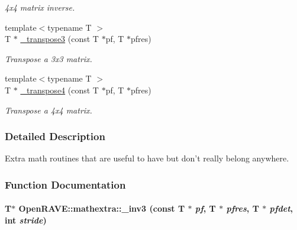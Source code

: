 \begin{DoxyCompactItemize}
\begin{DoxyCompactList}\small\item\em 4x4 matrix inverse. \item\end{DoxyCompactList}\item 
\hypertarget{namespaceOpenRAVE_1_1mathextra_a98432a8613c3ee83bb5b6d2092b406ff}{
{\footnotesize template$<$typename T $>$ }\\T $\ast$ \hyperlink{namespaceOpenRAVE_1_1mathextra_a98432a8613c3ee83bb5b6d2092b406ff}{\_\-transpose3} (const T $\ast$pf, T $\ast$pfres)}
\label{namespaceOpenRAVE_1_1mathextra_a98432a8613c3ee83bb5b6d2092b406ff}

\begin{DoxyCompactList}\small\item\em Transpose a 3x3 matrix. \item\end{DoxyCompactList}\item 
\hypertarget{namespaceOpenRAVE_1_1mathextra_af6485a9fbc08e970a019a8c78df0d54b}{
{\footnotesize template$<$typename T $>$ }\\T $\ast$ \hyperlink{namespaceOpenRAVE_1_1mathextra_af6485a9fbc08e970a019a8c78df0d54b}{\_\-transpose4} (const T $\ast$pf, T $\ast$pfres)}
\label{namespaceOpenRAVE_1_1mathextra_af6485a9fbc08e970a019a8c78df0d54b}

\begin{DoxyCompactList}\small\item\em Transpose a 4x4 matrix. \item\end{DoxyCompactList}\end{DoxyCompactItemize}


\subsubsection{Detailed Description}
Extra math routines that are useful to have but don't really belong anywhere. 

\subsubsection{Function Documentation}
\hypertarget{namespaceOpenRAVE_1_1mathextra_abb859ce4ca095416219250a83ca94793}{
\paragraph[{\_\-inv3}]{\setlength{\rightskip}{0pt plus 5cm}T$\ast$ OpenRAVE::mathextra::\_\-inv3 (const T $\ast$ {\em pf}, \/  T $\ast$ {\em pfres}, \/  T $\ast$ {\em pfdet}, \/  int {\em stride})}\hfill}
\label{namespaceOpenRAVE_1_1mathextra_abb859ce4ca095416219250a83ca94793}


